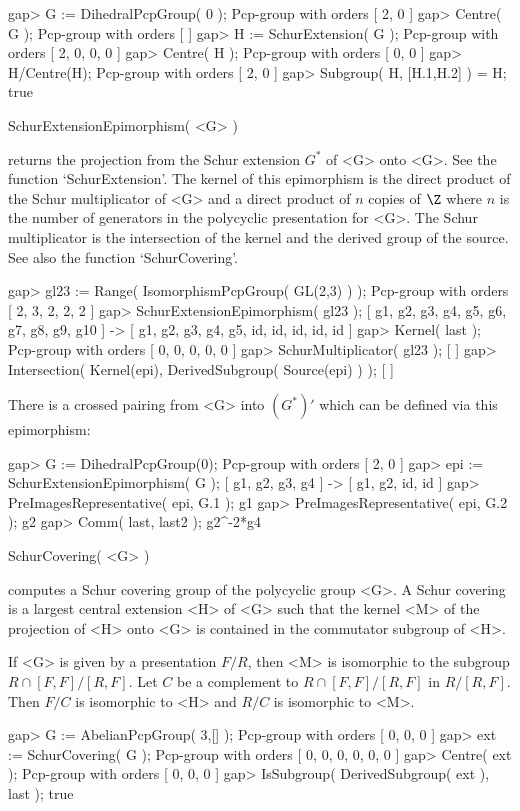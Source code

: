 \beginexample
gap> G := DihedralPcpGroup( 0 );
Pcp-group with orders [ 2, 0 ]
gap> Centre( G );
Pcp-group with orders [  ]
gap> H := SchurExtension( G );
Pcp-group with orders [ 2, 0, 0, 0 ]
gap> Centre( H );
Pcp-group with orders [ 0, 0 ]
gap> H/Centre(H);
Pcp-group with orders [ 2, 0 ]
gap> Subgroup( H, [H.1,H.2] ) = H;
true
\endexample

\>SchurExtensionEpimorphism( <G> )

returns the  projection from the  Schur extension $G^{*}$ of  <G> onto
<G>.   See   the  function  `SchurExtension'.   The   kernel  of  this
epimorphism is  the direct product  of the Schur multiplicator  of <G>
and a direct product of $n$ copies  of $\Z$ where $n$ is the number of
generators  in  the  polycyclic   presentation  for  <G>.   The  Schur
multiplicator is the intersection of  the kernel and the derived group
of the source.  See also the function `SchurCovering'.

\beginexample
gap> gl23 := Range( IsomorphismPcpGroup( GL(2,3) ) );
Pcp-group with orders [ 2, 3, 2, 2, 2 ]
gap> SchurExtensionEpimorphism( gl23 );
[ g1, g2, g3, g4, g5, g6, g7, g8, g9, g10 ] -> [ g1, g2, g3, g4, g5,
id, id, id, id, id ]
gap> Kernel( last );
Pcp-group with orders [ 0, 0, 0, 0, 0 ]
gap> SchurMultiplicator( gl23 );
[  ]
gap> Intersection( Kernel(epi), DerivedSubgroup( Source(epi) ) );
[  ]
\endexample

There  is a  crossed pairing  from <G>  into $(G^{*})'$  which  can be
defined via this epimorphism:

\beginexample
gap> G := DihedralPcpGroup(0);
Pcp-group with orders [ 2, 0 ]
gap> epi := SchurExtensionEpimorphism( G );
[ g1, g2, g3, g4 ] -> [ g1, g2, id, id ]
gap> PreImagesRepresentative( epi, G.1 );
g1
gap> PreImagesRepresentative( epi, G.2 );
g2
gap> Comm( last, last2 );
g2^-2*g4
\endexample

\>SchurCovering( <G> )

computes a Schur covering group  of the polycyclic group <G>.  A Schur
covering  is a  largest central  extension <H>  of <G>  such  that the
kernel  <M> of  the projection  of <H>  onto <G>  is contained  in the
commutator subgroup of <H>.

If <G> is given by a presentation $F/R$, then <M> is isomorphic to the
subgroup $R \cap [F,F] / [R,F]$.  Let $C$ be a complement to 
$R \cap [F,F] / [R,F]$ in $R/[R,F]$.  Then $F/C$ is isomorphic to <H>
and $R/C$ is isomorphic to <M>.

\beginexample
gap> G := AbelianPcpGroup( 3,[] );
Pcp-group with orders [ 0, 0, 0 ]
gap> ext := SchurCovering( G );
Pcp-group with orders [ 0, 0, 0, 0, 0, 0 ]
gap> Centre( ext );
Pcp-group with orders [ 0, 0, 0 ]
gap> IsSubgroup( DerivedSubgroup( ext ), last );
true
\endexample

